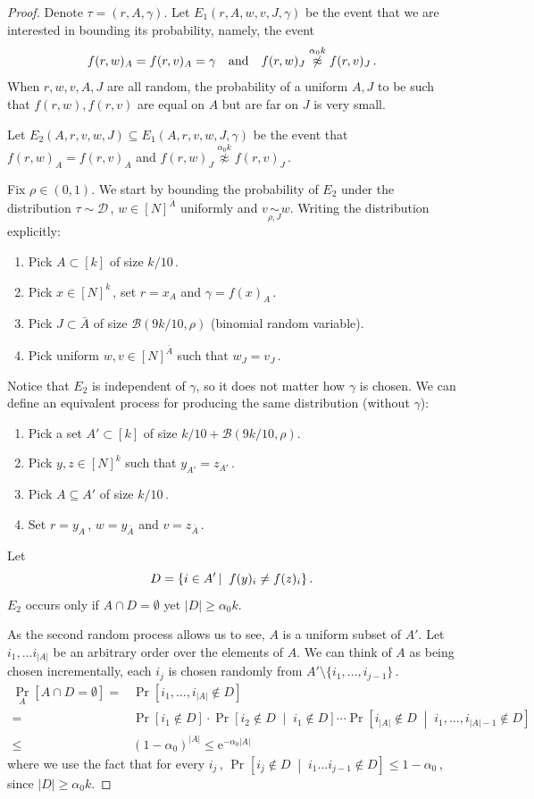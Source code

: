 \documentclass[11pt]{article}
\numberwithin{equation}{section}
\theoremstyle{definition}
\theoremstyle{plain}
\newcommand{\eee}{\mathrm e}
\newcommand{\Prob}[2][]{\Pr_{{#1}}\left[#2\right]} %
\newcommand{\abs}[1]{\lvert#1\rvert} %
\newcommand{\given}{\;\middle\vert\;} %
\newcommand\sett[2]{\left\{ #1 \left| \; \vphantom{#1 #2} \right. #2  \right\}} %
\newcommand\f{f} %
\newcommand\neqg[1]{\stackrel{{#1}}{ \not\approx}} %
\newcommand\cor[1]{\underset{\scriptscriptstyle#1}{\sim}} %
\newcommand\rest[1]{{\bar{#1}}}  %
\begin{document}
\begin{proof}
    Denote $\tau = (r,A,\gamma)$. Let $E_1(r,A,w,v,J,\gamma)$ be the event 
	that we are interested in bounding its probability, %
namely, the event 
    \[\f(r,w)_A = \f(r,v)_A=\gamma\quad\hbox{and}\quad \f(r,w)_J\neqg{\alpha_0 k}\f(r,v)_J\,.\] %
    When $r,w,v,A,J$ are all random, the probability of a uniform $A,J$ to be such that $\f(r,w),\f(r,v)$ are equal on $A$ but are far on $J$ is very small.
    
	Let $E_2(A,r,v,w,J) \subseteq E_1(A,r,v,w,J,\gamma)$ be the event that $\f(r,w)_A = \f(r,v)_A$ and $\f(r,w)_{ J}\neqg{\alpha_0 k}\f(r,v)_{J}$\,. 
	
Fix $\rho\in(0,1)$. 
	We start by bounding the probability of $E_2$ under the distribution $\tau\sim\mathcal{D}$\,, $w\in[N]^{\bar{A}}$ uniformly and $v\cor{\rho,J}{w}$.
	Writing the distribution explicitly:
	\begin{enumerate}
		\item Pick $A\subset[k]$ of size $k/10$\,.
		\item Pick $x\in[N]^k$\,, set $r = x_A$ and $\gamma = f(x)_A$\,.
		\item Pick $J\subset\bar{A}$ of size $\mathcal{B}(9k/10,\rho)$ (binomial random variable).
		\item Pick uniform $w,v\in[N]^{\bar{A}}$ such that $w_J= v_J$\,.
	\end{enumerate}
	Notice that $E_2$ is independent of $\gamma$, so it does not matter how $\gamma$ is chosen. We can define an equivalent process for producing the same distribution (without $\gamma$):
	\begin{enumerate}
		\item Pick a set $A'\subset[k]$ of size $k/10+\mathcal{B}(9k/10,\rho)$.
		\item Pick $y,z\in[N]^k$ such that $y_{A'} = z_{A'}$\,.
		\item Pick $A\subseteq A'$ of size $k/10$\,.
		\item Set $r=y_A$\,, $w=y_\rest{A}$ and $v=z_{\rest{A}}$\,.
	\end{enumerate}
	
	 Let
	\[ D = \sett{i\in A'}{\f(y)_{i}\neq\f(z)_{i}}. \]
	$E_2$ occurs only if $A\cap D=\emptyset$ yet $|D| \ge \alpha_0 k$.
	
	As the second random process allows us to see, $A$ is a uniform  subset of $A'$.
    Let $i_1,\dots i_{\abs{A}}$ be an arbitrary order over the elements of $A$. We can think of $A$ as being chosen incrementally, each $i_j$ is chosen randomly from $A'\setminus\{i_1,\ldots, i_{j-1}\}$\,.
	\begin{align}\label{eq:no intersection}
	\Prob[A]{A\cap D = \emptyset}=&\Prob{i_1,\ldots,i_{\abs{A}}\notin D}\\
	=&\Prob{i_1\notin D}\cdot \Prob{i_2\notin D\given i_1\notin D}\cdots \Prob{i_{\abs{A}}\notin D \given i_1,\ldots ,i_{\abs{A}-1}\notin D}\nonumber\\
\leq& (1-\alpha_0)^{\abs{A}}\leq \eee^{-\alpha_0 \abs{A}}\, %
\nonumber
	\end{align}
%
where  %
we use the fact that for every $i_j$\,, $\Prob{i_{j}\notin D \given i_1\ldots i_{j-1}\notin D}\leq 1-\alpha_0$\,, since $\abs{D}\geq\alpha_0 k$.
	

\end{proof}
\end{document}
